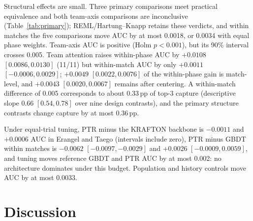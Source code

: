 \documentclass[sigconf,anonymous,nonacm]{acmart}
\begin{document}

Structural effects are small. Three primary comparisons meet practical equivalence and both team-axis comparisons are inconclusive (Table~\ref{tab:primary}); REML/Hartung--Knapp retains these verdicts, and within matches the five comparisons move AUC by at most 0.0018, or 0.0034 with equal phase weights. Team-axis AUC is positive (Holm $p<0.001$), but its 90\% interval crosses 0.005. Team attention raises within-phase AUC by $+0.0108$ $[0.0086,\allowbreak 0.0130]$ (11/11) but within-match AUC by only $+0.0011$ $[-0.0006,\allowbreak 0.0029]$; $+0.0049$ $[0.0022,\allowbreak 0.0076]$ of the within-phase gain is match-level, and $+0.0043$ $[0.0020,\allowbreak 0.0067]$ remains after centering. A within-match difference of 0.005 corresponds to about 0.33\,pp of top-3 capture (descriptive slope 0.66 $[0.54,\allowbreak 0.78]$ over nine design contrasts), and the primary structure contrasts change capture by at most 0.36\,pp.

Under equal-trial tuning, PTR minus the KRAFTON backbone is $-0.0011$ and $+0.0006$ AUC in Erangel and Taego (intervals include zero), PTR minus GBDT within matches is $-0.0062$ $[-0.0097,\allowbreak -0.0029]$ and $+0.0026$ $[-0.0009,\allowbreak 0.0059]$, and tuning moves reference GBDT and PTR AUC by at most 0.002: no architecture dominates under this budget. Population and history controls move AUC by at most 0.0033.


\section{Discussion}
\label{sec:discussion}
\end{document}
